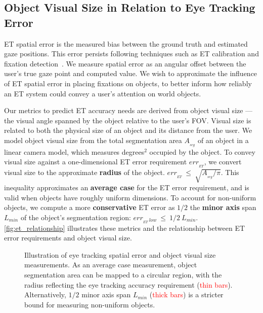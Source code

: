 \subsection{Object Visual Size in Relation to Eye Tracking Error}

ET spatial error is the measured bias between the ground truth and estimated gaze positions.  This error persists following techniques such as ET calibration and fixation detection~\cite{schuetz_eye_2022}.  We measure spatial error as an angular offset between the user's true gaze point and computed value.  We wish to approximate the influence of ET spatial error in placing fixations on objects, to better inform how reliably an ET system could convey a user's attention on world objects.

Our metrics to predict ET accuracy needs are derived from object visual size --- the visual angle spanned by the object relative to the user's FOV.  Visual size is related to both the physical size of an object and its distance from the user.  We model object visual size from the total segmentation area $A_{{}_{seg}}$ of an object in a linear camera model, which measures degrees$^2$ occupied by the object.  To convey visual size against a one-dimensional ET error requirement $err_{{}_{ET}}$, we convert visual size to the approximate \textbf{radius} of the object. $err_{{}_{ET}} \ \leq \ \sqrt{A_{{}_{seg}} / \pi}$.  This inequality approximates an \textbf{average case} for the ET error requirement, and is valid when objects have roughly uniform dimensions.  To account for non-uniform objects, we compute a more \textbf{conservative} ET error as $1 / 2$ the \textbf{minor axis} span $L_{min}$ of the object's segmentation region: $err_{{}_{ET}\ low} \ \leq \ 1 / 2 \ L_{min}$.  \autoref{fig:et_relationship} illustrates these metrics and the relationship between ET error requirements and object visual size.

\begin{figure}[t]
 \centering
 \caption{Illustration of eye tracking spatial error and object visual size measurements.  As an average case measurement, object segmentation area can be mapped to a circular region, with the radius reflecting the eye tracking accuracy requirement (\textcolor{red}{thin bars}).  Alternatively, $1 / 2$ minor axis span $L_{min}$ (\textcolor{red}{thick bars}) is a stricter bound for measuring non-uniform objects.}
 \label{fig:et_relationship}
\end{figure}

